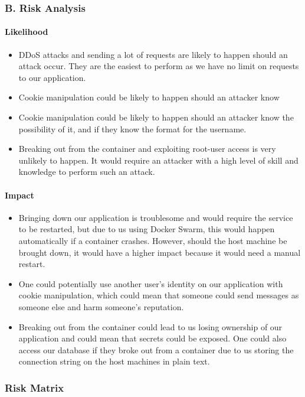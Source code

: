 \subsubsection*{B. Risk Analysis}

\paragraph{Likelihood}
\begin{itemize}
    \item DDoS attacks and sending a lot of requests are likely to happen should an attack occur. They are the easiest to perform as we have no limit on requests to our application.
    \item Cookie manipulation could be likely to happen should an attacker know
    \item Cookie manipulation could be likely to happen should an attacker know the possibility of it, and if they know the format for the username.
    \item Breaking out from the container and exploiting root-user access is very unlikely to happen. It would require an attacker with a high level of skill and knowledge to perform such an attack.
\end{itemize}

\paragraph{Impact}
\begin{itemize}
\item Bringing down our application is troublesome and would require the service to be restarted, but due to us using Docker Swarm, this would happen automatically if a container crashes. However, should the host machine be brought down, it would have a higher impact because it would need a manual restart.
\item One could potentially use another user's identity on our application with cookie manipulation, which could mean that someone could send messages as someone else and harm someone's reputation.
\item Breaking out from the container could lead to us losing ownership of our application and could mean that secrets could be exposed. One could also access our database if they broke out from a container due to us storing the connection string on the host machines in plain text.
\end{itemize}

\subsubsection*{Risk Matrix}

